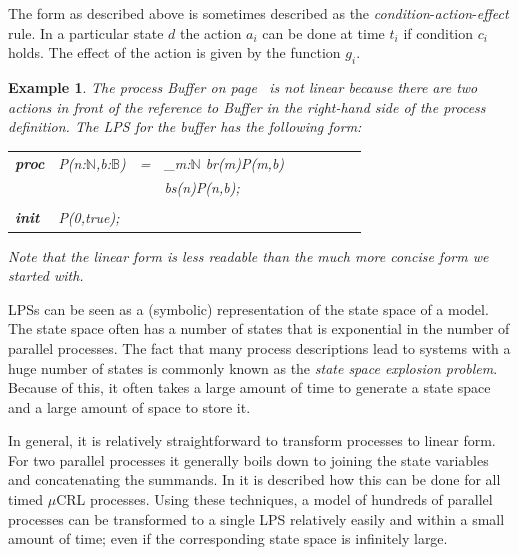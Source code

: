 \documentclass[a4paper,fleqn]{article}
\makeatletter
\newtheorem{thexample}[thdefinition]{Example}
\newenvironment{example}
  {\begin{thexample}\em}
  {\end{thexample}}
\newcommand{\frm}[1]{\mbox{\ensuremath{#1}}}
\newcommand{\bool}{\ensuremath{\mathbb{B}}}
\newcommand{\nat}{\ensuremath{\mathbb{N}}}
\newcommand{\seq}{\mathbin{\cdot}}
\newcommand{\alt}{\mathbin{+}}
\newcommand{\ap}{{:}}
\newcommand{\mCRL}{\frm{\mu}CRL\xspace}
\newenvironment{mcrl2}%
{\par\bigskip\noindent%
 \begin{tabular}{@{}>{\bf}p{2.3em}L@{\ }L@{\ }L@{\ }L@{\ }L@{\ }L@{\ }L@{\ }L}%
}%
{\end{tabular}\bigskip\par%
}
\makeatother
\begin{document}
The form as described above is sometimes described as the
\emph{condition}-\emph{action}-\emph{effect} rule. In a particular state $d$ the
action $a_i$ can be done at time $t_i$ if condition $c_i$ holds.  The effect of
the action is given by the function $g_i$. 

\begin{example}
The process {\it Buffer} on page~\pageref{spec:buffer} is \emph{not} linear
because there are two actions in front of the reference to {\it Buffer} in the
right-hand side of the process definition. The LPS for the buffer has the
following form:
\begin{mcrl2}
proc & P(n\ap\nat,b\ap\bool) & =  &\sum_{m\ap\nat} b\to r(m){\seq}P(m,\neg b)\\
     &                       &\alt&\neg b\to s(n){\seq}P(n,\neg b);\\
\\
init & P(0,true);
\end{mcrl2}
\noindent
Note that the linear form is less readable than the much more concise form we
started with.
\end{example}
LPSs can be seen as a (symbolic) representation of the state space of a model.
The state space often has a number of states that is exponential in the number
of parallel processes. The fact that many process descriptions lead to systems
with a huge number of states is commonly known as the \emph{state space
explosion problem}. Because of this, it often takes a large amount of time to
generate a state space and a large amount of space to store it.

In general, it is relatively straightforward to transform processes to linear
form. For two parallel processes it generally boils down to joining the state
variables and concatenating the summands. In \cite{Usenko 2002} it is described
how this can be done for all timed \mCRL processes. Using these techniques, a
model of hundreds of parallel processes can be transformed to a single LPS
relatively easily and within a small amount of time; even if the corresponding
state space is infinitely large. 
\end{document}
